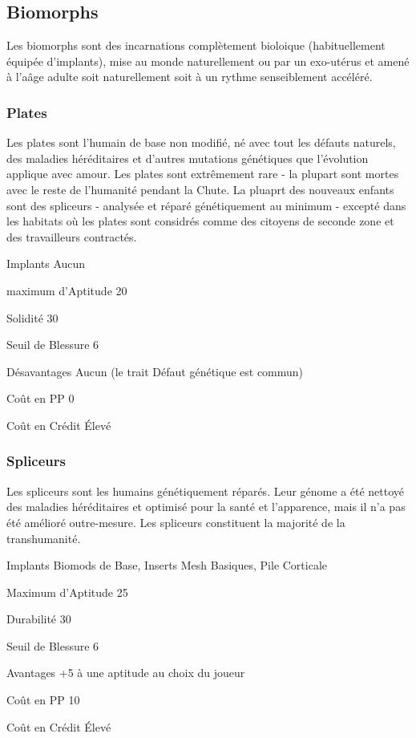 \subsection{Biomorphs} \label{sec:starting-biomorphs} 

Les biomorphs sont des incarnations complètement bioloique (habituellement équipée d'implants), mise au monde naturellement ou par un exo-utérus et amené à l'aâge adulte soit naturellement soit à un rythme senseiblement accéléré. 

\subsubsection{Plates} \label{sec:starting-flats} 

Les plates sont l'humain de base non modifié, né avec tout les défauts naturels, des maladies héréditaires et d'autres mutations génétiques que l'évolution applique avec amour. Les plates sont extrêmement rare - la plupart sont mortes avec le reste de l'humanité pendant la Chute. La pluaprt des nouveaux enfants sont des spliceurs - analysée et réparé génétiquement au minimum - excepté dans les habitats où les plates sont considrés comme des citoyens de seconde zone et des travailleurs contractés. 

\begin{description*} \item[Implants] Aucun \item[maximum d'Aptitude] 20 \item[Solidité] 30 \item[Seuil de Blessure] 6 \item[Désavantages] Aucun (le trait Défaut génétique est commun) \item[Coût en PP] 0 \item[Coût en Crédit] Élevé \end{description*} 

\subsubsection{Spliceurs} \label{sec:starting-splicers} 

Les spliceurs sont les humains génétiquement réparés. Leur génome a été nettoyé des maladies héréditaires et optimisé pour la santé et l'apparence, mais il n'a pas été amélioré outre-mesure. Les spliceurs constituent la majorité de la transhumanité. 

\begin{description*} \item[Implants] Biomods de Base, Inserts Mesh Basiques, Pile Corticale\item[Maximum d'Aptitude] 25 \item[Durabilité] 30 \item[Seuil de Blessure] 6 \item[Avantages] +5 à une aptitude au choix du joueur\item[Coût en PP] 10 \item[Coût en Crédit] Élevé \end{description*} 

